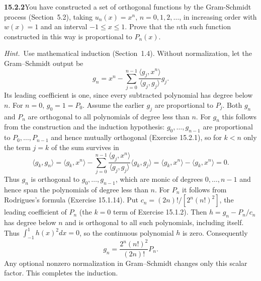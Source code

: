 \par\bigskip
\noindent\textbf{15.2.2}\quad You have constructed a set of orthogonal
functions by the Gram-Schmidt process (Section~5.2), taking
$u_{n}(x)=x^{n}$, $n=0,1,2,\ldots$, in increasing order with $w(x)=1$
and an interval $-1\le x\le1$. Prove that the $n$th such function
constructed in this way is proportional to $P_{n}(x)$.
\par\emph{Hint.}~Use mathematical induction (Section~1.4).
\solution
Without normalization, let the Gram--Schmidt output be
\[
g_n=x^n-\sum_{j=0}^{n-1}
\frac{\langle g_j,x^n\rangle}{\langle g_j,g_j\rangle}g_j.
\]
Its leading coefficient is one, since every subtracted polynomial has
degree below $n$. For $n=0$, $g_0=1=P_0$.
Assume the earlier $g_j$ are proportional to $P_j$.
Both $g_n$ and $P_n$ are orthogonal to all polynomials of degree
less than $n$. For $g_n$ this follows from the construction and the
induction hypothesis: $g_0,\ldots,g_{n-1}$ are proportional to
$P_0,\ldots,P_{n-1}$ and hence mutually orthogonal (Exercise 15.2.1),
so for $k<n$ only the term $j=k$ of the sum survives in
\[
\langle g_k,g_n\rangle=\langle g_k,x^n\rangle-\sum_{j=0}^{n-1}
\frac{\langle g_j,x^n\rangle}{\langle g_j,g_j\rangle}
\langle g_k,g_j\rangle
=\langle g_k,x^n\rangle-\langle g_k,x^n\rangle=0.
\]
Thus $g_n$ is orthogonal to $g_0,\ldots,g_{n-1}$, which are monic of
degrees $0,\ldots,n-1$ and hence span the polynomials of degree less
than $n$.
For $P_n$ it follows from Rodrigues's formula (Exercise 15.1.14).
Put $c_n=(2n)!/[2^n(n!)^2]$, the leading coefficient of $P_n$ (the
$k=0$ term of Exercise 15.1.2).
Then $h=g_n-P_n/c_n$ has degree below $n$ and is orthogonal to all
such polynomials, including itself. Thus
$\int_{-1}^1h(x)^2dx=0$, so the continuous polynomial $h$ is zero.
Consequently
\[
\boxed{g_n=\frac{2^n(n!)^2}{(2n)!}P_n}.
\]
Any optional nonzero normalization in Gram--Schmidt changes only this
scalar factor. This completes the induction.

